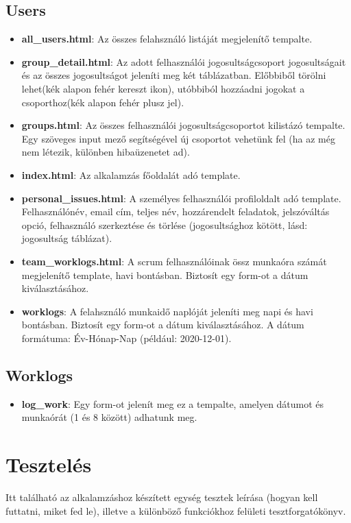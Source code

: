 \subsection{Users}
\begin{itemize}
	\item \textbf{all\_users.html}: Az összes felahsználó listáját megjelenítő tempalte.
	\item \textbf{group\_detail.html}: Az adott felhasználói jogosultságcsoport jogosultságait és az összes jogosultságot jeleníti meg két táblázatban. Előbbiből törölni lehet(kék alapon fehér kereszt ikon), utóbbiból hozzáadni jogokat a csoporthoz(kék alapon fehér plusz jel).
	\item \textbf{groups.html}: Az összes felhasználói jogosultságcsoportot kilistázó tempalte. Egy szöveges input mező segítségével új csoportot vehetünk fel (ha az még nem létezik, különben hibaüzenetet ad).
	\item \textbf{index.html}: Az alkalamzás főoldalát adó template.
	\item \textbf{personal\_issues.html}: A személyes felhasználói profiloldalt adó template. Felhasználónév, email cím, teljes név, hozzárendelt feladatok, jelszóváltás opció, felhasználó szerkeztése és törlése (jogosultsághoz kötött, lásd: jogosultság táblázat).
	\item \textbf{team\_worklogs.html}: A scrum felhasználóinak össz munkaóra számát megjelenítő template, havi bontásban. Biztosít egy form-ot a dátum kiválasztásához.
	\item \textbf{worklogs}: A felahsználó munkaidő naplóját jeleníti meg napi és havi bontásban. Biztosít egy form-ot a dátum kiválasztásához. A dátum formátuma: Év-Hónap-Nap (például: 2020-12-01).
\end{itemize}
\subsection{Worklogs}
\begin{itemize}
	\item \textbf{log\_work}: Egy form-ot jelenít meg ez a tempalte, amelyen dátumot és munkaórát (1 és 8 között) adhatunk meg.
\end{itemize}

\section{Tesztelés}

Itt található az alkalamzáshoz készített egység tesztek leírása (hogyan kell futtatni, miket fed le), illetve a különböző funkciókhoz felületi tesztforgatókönyv.

